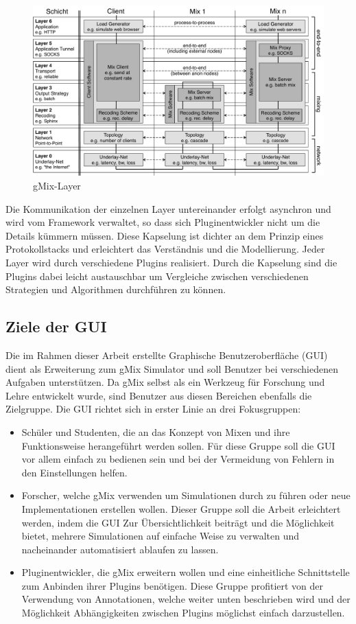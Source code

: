\documentclass[a4paper, 11pt]{article} %
\begin{document}
\begin{figure}
     \centering
     \includegraphics[width=\textwidth]{img/simulatorNamingNew.pdf}
     \caption{gMix-Layer}
     \label{img:gMixLayers}
\end{figure}

Die Kommunikation der einzelnen Layer untereinander erfolgt asynchron und wird vom Framework verwaltet, so dass sich Pluginentwickler nicht um die Details kümmern müssen. Diese Kapselung ist dichter an dem Prinzip eines Protokollstacks und erleichtert das Verständnis und die Modellierung. Jeder Layer wird durch verschiedene Plugins realisiert. Durch die Kapselung sind die Plugins dabei leicht austauschbar um Vergleiche zwischen verschiedenen Strategien und Algorithmen durchführen zu können.

\subsection{Ziele der GUI} %
\label{sub:ziele_der_gui}
Die im Rahmen dieser Arbeit erstellte Graphische Benutzeroberfläche (GUI) dient als Erweiterung zum gMix Simulator und soll Benutzer bei verschiedenen Aufgaben unterstützen. Da gMix selbst als ein Werkzeug für Forschung und Lehre entwickelt wurde, sind Benutzer aus diesen Bereichen ebenfalls die Zielgruppe. Die GUI richtet sich in erster Linie an drei Fokusgruppen:
\begin{itemize}
	\item Schüler und Studenten, die an das Konzept von Mixen und ihre Funktionsweise herangeführt werden sollen. Für diese Gruppe soll die GUI vor allem einfach zu bedienen sein und bei der Vermeidung von Fehlern in den Einstellungen helfen.
	\item Forscher, welche gMix verwenden um Simulationen durch zu führen oder neue Implementationen erstellen wollen. Dieser Gruppe soll die Arbeit erleichtert werden, indem die GUI Zur Übersichtlichkeit beiträgt und die Möglichkeit bietet, mehrere Simulationen auf einfache Weise zu verwalten und nacheinander automatisiert ablaufen zu lassen.
	\item Pluginentwickler, die gMix erweitern wollen und eine einheitliche Schnittstelle zum Anbinden ihrer Plugins benötigen. Diese Gruppe profitiert von der Verwendung von Annotationen, welche weiter unten beschrieben wird und der Möglichkeit Abhängigkeiten zwischen Plugins möglichst einfach darzustellen.
\end{itemize}
\end{document}
